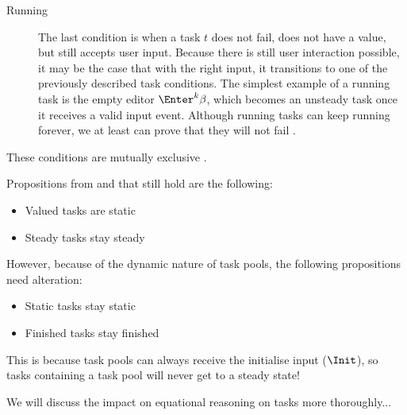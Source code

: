 \begin{description}
  \item[Running]
    The last condition is when a task $t$ does not fail, does not have a value, but still accepts user input.
    Because there is still user interaction possible, it may be the case that with the right input, it transitions to one of the previously described task conditions.
    The simplest example of a running task is the empty editor $\Enter^k \beta$, which becomes an unsteady task once it receives a valid input event.
    Although running tasks can keep running forever,
    we at least can prove that they will not fail .

\end{description}

These conditions are mutually exclusive .









Propositions from \cite{Steenvoorden22} and \cite{Klijnsma2020} that still hold are the following:

\begin{itemize}
  \item Valued tasks are static
  \item Steady tasks stay steady
\end{itemize}

However, because of the dynamic nature of task pools, the following propositions need alteration:

\begin{itemize}
  \item Static tasks stay static
  \item Finished tasks stay finished
\end{itemize}

This is because task pools can always receive the initialise input ($\Init$),
so tasks containing a task pool will never get to a steady state!

We will discuss the impact on equational reasoning on tasks more thoroughly...